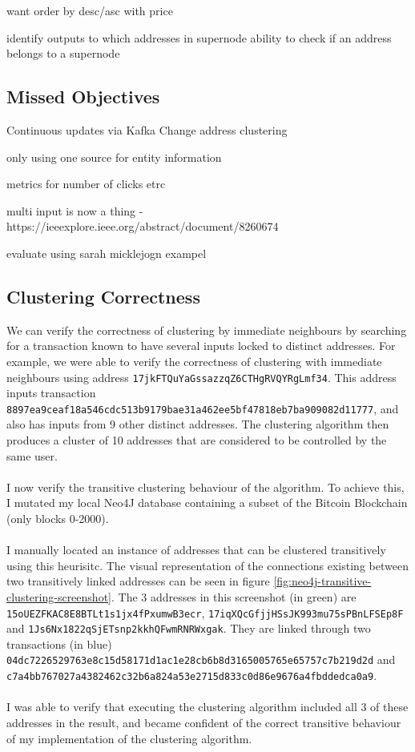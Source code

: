 want order by desc/asc with price

identify outputs to which addresses in supernode
ability to check if an address belongs to a supernode 


\subsection{Missed Objectives}
Continuous updates via Kafka
Change address clustering


only using one source for entity information 

metrics for number of clicks etrc


multi input is now a thing - https://ieeexplore.ieee.org/abstract/document/8260674

evaluate using sarah micklejogn exampel 



\subsection{Clustering Correctness}

We can verify the correctness of clustering by immediate neighbours by searching for a transaction known to have several inputs locked to distinct addresses. For example, we were able to verify the correctness of clustering with immediate neighbours using address \texttt{17jkFTQuYaGssazzqZ6CTHgRVQYRgLmf34}. This address inputs transaction \\\texttt{8897ea9ceaf18a546cdc513b9179bae31a462ee5bf47818eb7ba909082d11777}, and also has inputs from 9 other distinct addresses. The clustering algorithm then produces a cluster of 10 addresses that are considered to be controlled by the same user. 
\\\\
I now verify the transitive clustering behaviour of the algorithm.  
To achieve this, I mutated my local Neo4J database containing a subset of the Bitcoin Blockchain (only blocks 0-2000). 
\\\\
I manually located an instance of addresses that can be clustered transitively using this heurisitc. The visual representation of the connections existing between two transitively linked addresses can be seen in figure \ref{fig:neo4j-transitive-clustering-screenshot}. The 3 addresses in this screenshot (in green) are \texttt{15oUEZFKAC8E8BTLt1s1jx4fPxumwB3ecr}, \texttt{17iqXQcGfjjHSsJK993mu75sPBnLFSEp8F} and \texttt{1Js6Nx1822qSjETsnp2kkhQFwmRNRWxgak}. They are linked through two transactions (in blue) \texttt{04dc7226529763e8c15d58171d1ac1e28cb6b8d3165005765e65757c7b219d2d} and \texttt{c7a4bb767027a4382462c32b6a824a53e2715d833c0d86e9676a4fbddedca0a9}. 
\\\\
I was able to verify that executing the clustering algorithm included all 3 of these addresses in the result, and became confident of the correct transitive behaviour of my implementation of the clustering algorithm. 

